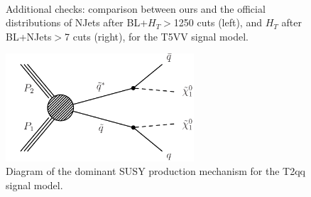         \begin{figure}
        \centering
        \hspace{-1 cm}
        ~ %
        \caption{Additional checks: comparison between ours and the official distributions of NJets after BL+$H_T$$>$1250 cuts (left), and $H_T$ after BL+NJets$>$7 cuts (right), for the T5VV signal model.}
        \end{figure}   
        

\clearpage

\begin{figure}[h!]
\centering
\includegraphics[width=7cm]{figures/Appendices/Ma5ValidationSUS13012/T2qq.pdf}
\caption{Diagram of the dominant SUSY production mechanism
for the T2qq signal model.}
\label{fig:T2qq}
\end{figure}

